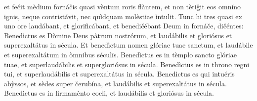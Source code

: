 et fečit mèdium fornáčis quasi vèntum roris flàntem, et non tètiǧit eos omníno ignis, neque contristávit, nec quìdquam molèstiae ìntulit.
Tunc hi tres quasi ex uno ore laudábant, et glorificábant, et benedičébant Deum in fornáče, dičéntes:
Benedìctus es Dòmine Deus pàtrum nostrórum, et laudábilis et gloriósus et superexaltátus in sécula. Et benedìctum nomen glóriae tuae sanctum, et laudábile et superexaltátum in òmnibus séculīs.
Benedìctus es in tèmplo sancto glóriae tuae, et superlaudábilis et supergloriósus in sécula.
Benedìctus es in throno regni tui, et superlaudábilis et superexaltátus in sécula.
Benedìctus es qui intuéris abỳssos, et sèdes super čerubína, et laudábilis et superexaltátus in sécula.
Benedìctus es in firmamènto coeli, et laudábilis et gloriósus in sécula.
